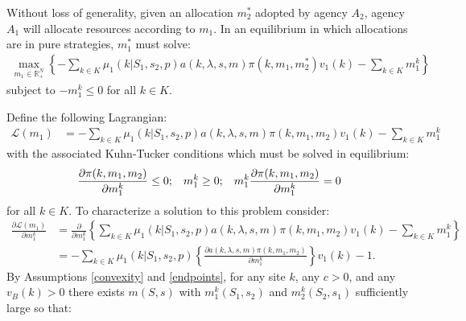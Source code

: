 \documentclass[12pt]{article}
\newcommand{\pderiv}[2]{\frac{\partial #1}{\partial #2}}
\begin{document}
\vspace{30mm}
Without loss of generality, given an allocation $m^*_{2}$ adopted by agency $A_{2}$, agency $A_1$ will allocate resources according to $m_1$.  In an equilibrium in which allocations are in pure strategies, $m_1^*$ must solve:
\begin{align*}
\max_{m_1\in\mathbb{R}_+^N}\left\{-\sum_{k \in K} \mu_1(k|S_1, s_{2},p) a(k,\lambda,s,m)\pi(k, m_1,m^*_{2})v_1(k)-\sum_{k\in K}m_1^k\right\}
\end{align*}subject to $-m_1^k\leq0$ for all $k\in K$.  



Define the following Lagrangian:
\begin{align*}
\mathcal{L}(m_1)&=-\sum_{k\in K}\mu_1(k|S_1,s_2,p)a(k,\lambda,s,m)\pi(k,m_1,m_2)v_1(k)-\sum_{k\in K}m_1^k%
\end{align*}with the associated Kuhn-Tucker conditions which must be solved in equilibrium:
\begin{align*}
\pderiv{\pi(k,m_1,m_2)}{m_1^k}\leq0;\hspace{3mm}m_1^k\geq0;\hspace{3mm}m_1^k\pderiv{\pi(k,m_1,m_2)}{m_1^k}=0
\end{align*}for all $k\in K$.  To characterize a solution to this problem consider:
\begin{align*}
\pderiv{\mathcal{L}(m_1)}{m_1^k}&=\pderiv{}{m_1^k}\left\{\sum_{k\in K}\mu_1(k|S_1,s_2,p)a(k,\lambda,s,m)\pi(k,m_1,m_2)v_1(k)-\sum_{k\in K}m_1^k\right\}\\
&=-\sum_{k\in K}\mu_1(k|S_1,s_2,p)\left\{\pderiv{a(k,\lambda,s,m)\pi(k,m_1,m_2)}{m_1^k}\right\}v_1(k)-1.
\end{align*}By Assumptions \ref{convexity} and \ref{endpoints}, for any site $k$, any $c>0$, and any $v_B(k)>0$ there exists $m(S,s)$ with $m_1^k(S_1,s_2)$ and $m_2^k(S_2,s_1)$ sufficiently large so that:
\end{document}
